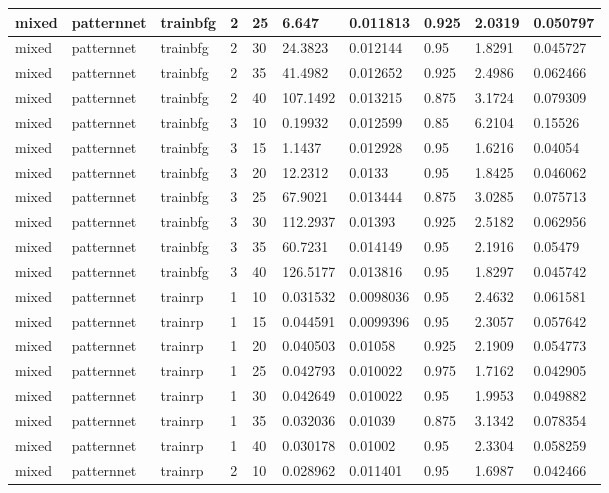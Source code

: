 \begin{longtable}{lllllllll}
mixed & patternnet & trainbfg & 2 & 25 & 6.647 & 0.011813 & 0.925 & 2.0319 & 0.050797 \\ \hline 
mixed & patternnet & trainbfg & 2 & 30 & 24.3823 & 0.012144 & 0.95 & 1.8291 & 0.045727 \\ \hline 
mixed & patternnet & trainbfg & 2 & 35 & 41.4982 & 0.012652 & 0.925 & 2.4986 & 0.062466 \\ \hline 
mixed & patternnet & trainbfg & 2 & 40 & 107.1492 & 0.013215 & 0.875 & 3.1724 & 0.079309 \\ \hline 
mixed & patternnet & trainbfg & 3 & 10 & 0.19932 & 0.012599 & 0.85 & 6.2104 & 0.15526 \\ \hline 
mixed & patternnet & trainbfg & 3 & 15 & 1.1437 & 0.012928 & 0.95 & 1.6216 & 0.04054 \\ \hline 
mixed & patternnet & trainbfg & 3 & 20 & 12.2312 & 0.0133 & 0.95 & 1.8425 & 0.046062 \\ \hline 
mixed & patternnet & trainbfg & 3 & 25 & 67.9021 & 0.013444 & 0.875 & 3.0285 & 0.075713 \\ \hline 
mixed & patternnet & trainbfg & 3 & 30 & 112.2937 & 0.01393 & 0.925 & 2.5182 & 0.062956 \\ \hline 
mixed & patternnet & trainbfg & 3 & 35 & 60.7231 & 0.014149 & 0.95 & 2.1916 & 0.05479 \\ \hline 
mixed & patternnet & trainbfg & 3 & 40 & 126.5177 & 0.013816 & 0.95 & 1.8297 & 0.045742 \\ \hline 
mixed & patternnet & trainrp & 1 & 10 & 0.031532 & 0.0098036 & 0.95 & 2.4632 & 0.061581 \\ \hline 
mixed & patternnet & trainrp & 1 & 15 & 0.044591 & 0.0099396 & 0.95 & 2.3057 & 0.057642 \\ \hline 
mixed & patternnet & trainrp & 1 & 20 & 0.040503 & 0.01058 & 0.925 & 2.1909 & 0.054773 \\ \hline 
mixed & patternnet & trainrp & 1 & 25 & 0.042793 & 0.010022 & 0.975 & 1.7162 & 0.042905 \\ \hline 
mixed & patternnet & trainrp & 1 & 30 & 0.042649 & 0.010022 & 0.95 & 1.9953 & 0.049882 \\ \hline 
mixed & patternnet & trainrp & 1 & 35 & 0.032036 & 0.01039 & 0.875 & 3.1342 & 0.078354 \\ \hline 
mixed & patternnet & trainrp & 1 & 40 & 0.030178 & 0.01002 & 0.95 & 2.3304 & 0.058259 \\ \hline 
mixed & patternnet & trainrp & 2 & 10 & 0.028962 & 0.011401 & 0.95 & 1.6987 & 0.042466 \\ \hline 

\end{longtable}
